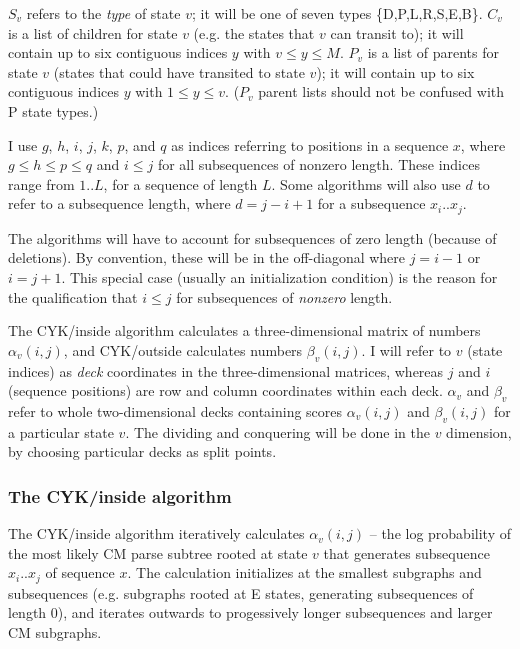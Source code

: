 \documentclass[11pt]{article}
\begin{document}
$S_v$ refers to the \emph{type} of state $v$; it will be one of seven
types \{D,P,L,R,S,E,B\}. $C_v$ is a list of children for state $v$
(e.g. the states that $v$ can transit to); it will contain up to six
contiguous indices $y$ with $v \leq y \leq M$. $P_v$ is a list of
parents for state $v$ (states that could have transited to state $v$);
it will contain up to six contiguous indices $y$ with $1 \leq y \leq
v$. ($P_v$ parent lists should not be confused with P state types.)

I use $g$, $h$, $i$, $j$, $k$, $p$, and $q$ as indices referring to
positions in a sequence $x$, where $g \leq h \leq p \leq q$ and $i
\leq j$ for all subsequences of nonzero length. These indices range
from $1..L$, for a sequence of length $L$. Some algorithms will also
use $d$ to refer to a subsequence length, where $d = j-i+1$ for a
subsequence $x_i..x_j$.

The algorithms will have to account for subsequences of zero length
(because of deletions). By convention, these will be in the
off-diagonal where $j = i-1$ or $i = j+1$. This special case (usually
an initialization condition) is the reason for the qualification that
$i \leq j$ for subsequences of \emph{nonzero} length.

The CYK/inside algorithm calculates a three-dimensional matrix of
numbers $\alpha_v(i,j)$, and CYK/outside calculates numbers
$\beta_v(i,j)$. I will refer to $v$ (state indices) as \emph{deck}
coordinates in the three-dimensional matrices, whereas $j$ and $i$
(sequence positions) are row and column coordinates within each deck.
$\alpha_{v}$ and $\beta_{v}$ refer to whole two-dimensional decks
containing scores $\alpha_v(i,j)$ and $\beta_v(i,j)$ for a particular
state $v$. The dividing and conquering will be done in the $v$
dimension, by choosing particular decks as split points.

\subsubsection{The CYK/inside algorithm}

The CYK/inside algorithm iteratively calculates $\alpha_v(i,j)$ -- the
log probability of the most likely CM parse subtree rooted at state
$v$ that generates subsequence $x_i..x_j$ of sequence $x$. The
calculation initializes at the smallest subgraphs and subsequences
(e.g. subgraphs rooted at E states, generating subsequences of length
0), and iterates outwards to progessively longer subsequences and
larger CM subgraphs.
\end{document}

